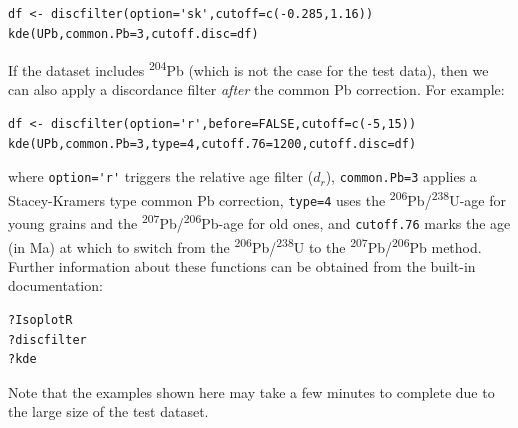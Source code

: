 \documentclass[gchron, manuscript]{copernicus}
\begin{document}
\begin{verbatim}
df <- discfilter(option='sk',cutoff=c(-0.285,1.16))
kde(UPb,common.Pb=3,cutoff.disc=df)
\end{verbatim}

\noindent If the dataset includes \textsuperscript{204}Pb (which is
not the case for the test data), then we can also apply a discordance
filter \textit{after} the common Pb correction. For example:

\begin{verbatim}
df <- discfilter(option='r',before=FALSE,cutoff=c(-5,15))
kde(UPb,common.Pb=3,type=4,cutoff.76=1200,cutoff.disc=df)
\end{verbatim}

\noindent where \verb|option='r'| triggers the relative age filter
($d_r$), \texttt{common.Pb=3} applies a Stacey-Kramers type common Pb
correction, \texttt{type=4} uses the
\textsuperscript{206}Pb/\textsuperscript{238}U-age for young grains
and the \textsuperscript{207}Pb/\textsuperscript{206}Pb-age for old
ones, and \texttt{cutoff.76} marks the age (in Ma) at which to switch
from the \textsuperscript{206}Pb/\textsuperscript{238}U to the
\textsuperscript{207}Pb/\textsuperscript{206}Pb method. Further
information about these functions can be obtained from the built-in
documentation:

\begin{verbatim}
?IsoplotR
?discfilter
?kde
\end{verbatim}

\noindent Note that the examples shown here may take a few minutes to
complete due to the large size of the test dataset.

\noappendix       %



\end{document}

